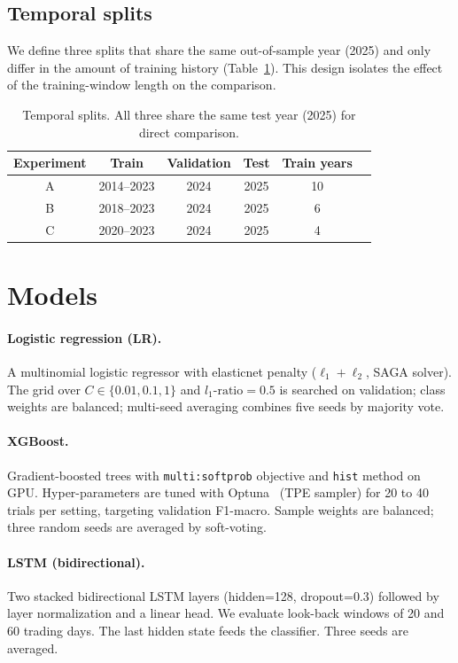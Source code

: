 \documentclass[runningheads]{llncs}
\begin{document}
\subsection{Temporal splits}

We define three splits that share the same out-of-sample year (2025) and only differ in the amount of training history (Table~\ref{tab:splits}). This design isolates the effect of the training-window length on the comparison.

\begin{table}[t]
\centering
\caption{Temporal splits. All three share the same test year (2025) for direct comparison.}
\label{tab:splits}
\begin{tabular}{cccccc}
\toprule
Experiment & Train & Validation & Test & Train years \\
\midrule
A & 2014--2023 & 2024 & 2025 & 10 \\
B & 2018--2023 & 2024 & 2025 & 6 \\
C & 2020--2023 & 2024 & 2025 & 4 \\
\bottomrule
\end{tabular}
\end{table}

\section{Models}
\label{sec:models}

\paragraph{Logistic regression (LR).}
A multinomial logistic regressor with elasticnet penalty ($\ell_1+\ell_2$, SAGA solver). The grid over $C \in \{0.01, 0.1, 1\}$ and $l_1\text{-ratio}=0.5$ is searched on validation; class weights are balanced; multi-seed averaging combines five seeds by majority vote.

\paragraph{XGBoost.}
Gradient-boosted trees with \texttt{multi:softprob} objective and \texttt{hist} method on GPU. Hyper-parameters are tuned with Optuna~\cite{akiba2019} (TPE sampler) for 20 to 40 trials per setting, targeting validation F1-macro. Sample weights are balanced; three random seeds are averaged by soft-voting.

\paragraph{LSTM (bidirectional).}
Two stacked bidirectional LSTM layers (hidden=128, dropout=0.3) followed by layer normalization and a linear head. We evaluate look-back windows of 20 and 60 trading days. The last hidden state feeds the classifier. Three seeds are averaged.
\end{document}
